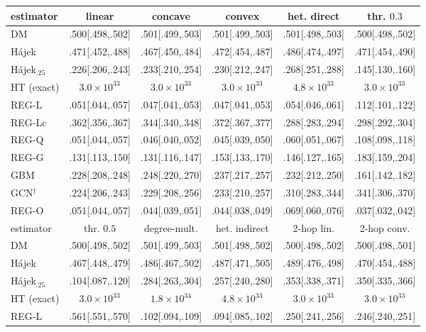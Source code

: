 \footnotesize\setlength{\tabcolsep}{2.6pt}
\begin{tabular}{lccccc}
\toprule
estimator & linear & concave & convex & het. direct & thr. $0.3$ \\
\midrule
DM & .500[.498,.502] & .501[.499,.503] & .501[.499,.503] & .501[.498,.503] & .500[.498,.502] \\
H\'ajek & .471[.452,.488] & .467[.450,.484] & .472[.454,.487] & .486[.474,.497] & .471[.454,.490] \\
H\'ajek$_{.25}$ & .226[.206,.243] & .233[.210,.254] & .230[.212,.247] & .268[.251,.288] & .145[.130,.160] \\
HT (exact) & $3.0\!\times\!10^{33}$ & $3.0\!\times\!10^{33}$ & $3.0\!\times\!10^{33}$ & $4.8\!\times\!10^{33}$ & $3.0\!\times\!10^{33}$ \\
REG-L & .051[.044,.057] & .047[.041,.053] & .047[.041,.053] & .054[.046,.061] & .112[.101,.122] \\
REG-Lc & .362[.356,.367] & .344[.340,.348] & .372[.367,.377] & .288[.283,.294] & .298[.292,.304] \\
REG-Q & .051[.044,.057] & .046[.040,.052] & .045[.039,.050] & .060[.051,.067] & .108[.098,.118] \\
REG-G & .131[.113,.150] & .131[.116,.147] & .153[.133,.170] & .146[.127,.165] & .183[.159,.204] \\
GBM & .228[.208,.248] & .248[.220,.270] & .237[.217,.257] & .232[.212,.250] & .161[.142,.182] \\
GCN$^{\dagger}$ & .224[.206,.243] & .229[.208,.256] & .233[.210,.257] & .310[.283,.344] & .341[.306,.370] \\
REG-O & .051[.044,.057] & .044[.039,.051] & .044[.038,.049] & .069[.060,.076] & .037[.032,.042] \\
\midrule
estimator & thr. $0.5$ & degree-mult. & het. indirect & 2-hop lin. & 2-hop conv. \\
\midrule
DM & .500[.498,.502] & .501[.499,.503] & .501[.498,.502] & .500[.498,.502] & .500[.498,.501] \\
H\'ajek & .467[.448,.479] & .486[.467,.502] & .487[.471,.505] & .489[.476,.498] & .470[.454,.488] \\
H\'ajek$_{.25}$ & .104[.087,.120] & .284[.263,.304] & .257[.240,.280] & .353[.338,.371] & .350[.335,.366] \\
HT (exact) & $3.0\!\times\!10^{33}$ & $1.8\!\times\!10^{34}$ & $4.8\!\times\!10^{33}$ & $3.0\!\times\!10^{33}$ & $3.0\!\times\!10^{33}$ \\
REG-L & .561[.551,.570] & .102[.094,.109] & .094[.085,.102] & .250[.241,.256] & .246[.240,.251] \\

\end{tabular}
